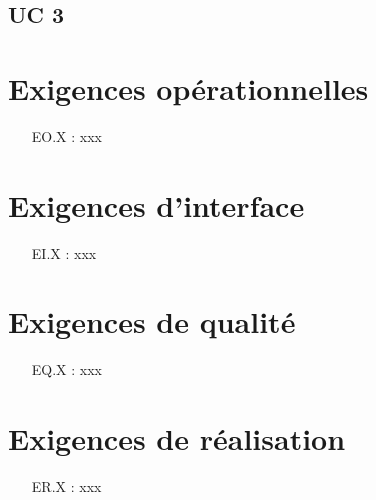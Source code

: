 \documentclass[a4paper,11pt,french]{article}
\begin{document}
\subsection{UC 3}

\newpage
\section{Exigences opérationnelles}
\begin{enumerate}
\item [EO.X] : xxx
\end{enumerate}

\section{Exigences d'interface}
\begin{enumerate}
\item [EI.X] : xxx
\end{enumerate}

\section{Exigences de qualité}
\begin{enumerate}
\item [EQ.X] : xxx
\end{enumerate}

\section{Exigences de réalisation}
\begin{enumerate}
\item [ER.X] : xxx
\end{enumerate}
\end{document}
